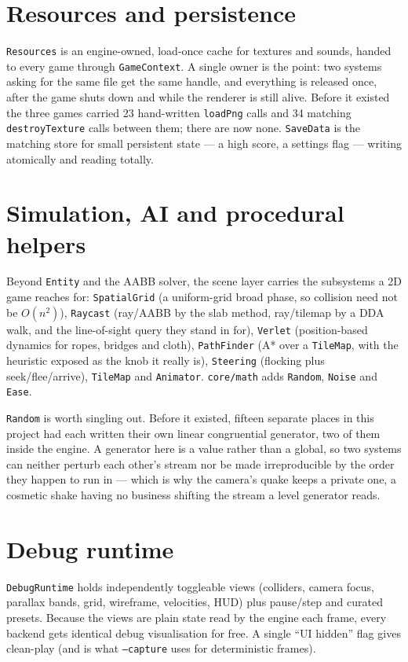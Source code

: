 \documentclass[11pt]{report}
\newcommand{\code}[1]{\texttt{#1}}
\begin{document}
\section{Resources and persistence}
\code{Resources} is an engine-owned, load-once cache for textures and sounds,
handed to every game through \code{GameContext}. A single owner is the point: two
systems asking for the same file get the same handle, and everything is released
once, after the game shuts down and while the renderer is still alive. Before it
existed the three games carried 23 hand-written \code{loadPng} calls and 34
matching \code{destroyTexture} calls between them; there are now none.
\code{SaveData} is the matching store for small persistent state --- a high
score, a settings flag --- writing atomically and reading totally.

\section{Simulation, AI and procedural helpers}
Beyond \code{Entity} and the AABB solver, the scene layer carries the subsystems
a 2D game reaches for: \code{SpatialGrid} (a uniform-grid broad phase, so
collision need not be $O(n^2)$), \code{Raycast} (ray/AABB by the slab method,
ray/tilemap by a DDA walk, and the line-of-sight query they stand in for),
\code{Verlet} (position-based dynamics for
ropes, bridges and cloth), \code{PathFinder} (A* over a \code{TileMap}, with the
heuristic exposed as the knob it really is), \code{Steering} (flocking plus
seek/flee/arrive), \code{TileMap} and \code{Animator}. \code{core/math} adds
\code{Random}, \code{Noise} and \code{Ease}.

\code{Random} is worth singling out. Before it existed, fifteen separate places
in this project had each written their own linear congruential generator, two of
them inside the engine. A generator here is a value rather than a global, so two
systems can neither perturb each other's stream nor be made irreproducible by
the order they happen to run in --- which is why the camera's quake keeps a
private one, a cosmetic shake having no business shifting the stream a level
generator reads.

\section{Debug runtime}
\code{DebugRuntime} holds independently toggleable views (colliders, camera focus,
parallax bands, grid, wireframe, velocities, HUD) plus pause/step and curated
presets. Because the views are plain state read by the engine each frame, every
backend gets identical debug visualisation for free. A single ``UI hidden'' flag
gives clean-play (and is what \code{--capture} uses for deterministic frames).
\end{document}
